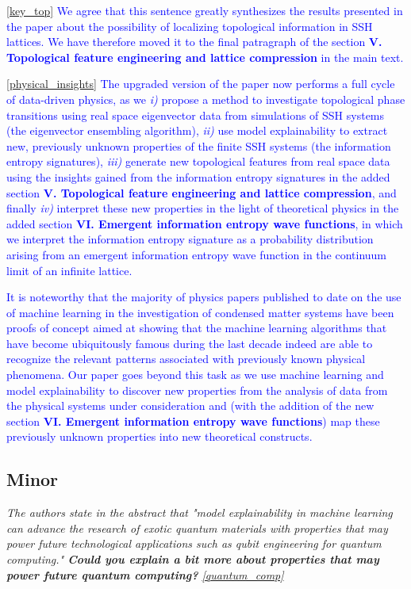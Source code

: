 \documentclass[10pt]{revtex4-1}
\newcounter{quoter}
\newcommand{\genquote}[1]{\refstepcounter{quoter} \label{#1} \ref{#1}}
\newcommand{\citequote}[1]{\ref{#1}}
\begin{document}
\vspace{0.25cm}
\textcolor{blue}{\citequote{key_top} We agree that this sentence greatly synthesizes the results presented in the paper about the possibility of localizing topological information in SSH lattices. We have therefore moved it to the final patragraph of the section \textbf{V. Topological feature engineering and lattice compression} in the main text.}

\textcolor{blue}{\citequote{physical_insights} The upgraded version of the paper now performs a full cycle of data-driven physics, as we \emph{i)} propose a method to investigate topological phase transitions using real space eigenvector data from simulations of SSH systems (the eigenvector ensembling algorithm), \emph{ii)} use model explainability to extract new, previously unknown properties of the finite SSH systems (the information entropy signatures), \emph{iii)} generate new topological features from real space data using the insights gained from the information entropy signatures in the added section \textbf{V. Topological feature engineering and lattice compression},  and finally \emph{iv)} interpret these new properties in the light of theoretical physics in the added section \textbf{VI. Emergent information entropy wave functions}, in which we interpret the information entropy signature as a probability distribution arising from an emergent information entropy wave function in the continuum limit of an infinite lattice.}

\textcolor{blue}{It is noteworthy that the majority of physics papers published to date on the use of machine learning in the investigation of condensed matter systems have been proofs of concept aimed at showing that the machine learning algorithms that have become ubiquitously famous during the last decade indeed are able to recognize the relevant patterns associated with previously known physical phenomena. Our paper goes beyond this task as we use machine learning and model explainability to discover new properties from the analysis of data from the physical systems under consideration and (with the addition of the new section \textbf{VI. Emergent information entropy wave functions}) map these previously unknown properties into new theoretical  constructs.}

\subsection*{Minor}

\emph{The authors state in the abstract that "model explainability in machine learning can advance the research of exotic quantum materials
with properties that may power future technological applications such as qubit engineering for quantum computing." \textbf{Could you explain a bit more about properties that may power future quantum computing?}\genquote{quantum_comp}}
\end{document}
